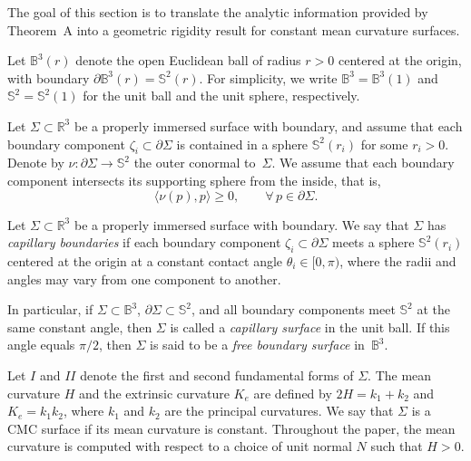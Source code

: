 \documentclass[11pt]{article}
\numberwithin{equation} {section}
\begin{document}
The goal of this section is to translate the analytic information provided by Theorem~A into a geometric rigidity result for constant mean curvature surfaces.

Let $\mathbb{B}^3(r)$ denote the open Euclidean ball of radius $r>0$ centered at the origin,
with boundary $\partial\mathbb{B}^3(r)=\mathbb{S}^2(r)$.
For simplicity, we write $\mathbb{B}^3=\mathbb{B}^3(1)$ and
$\mathbb{S}^2=\mathbb{S}^2(1)$ for the unit ball and the unit sphere, respectively.

Let $\Sigma\subset\mathbb{R}^3$ be a properly immersed surface with boundary, and assume that
each boundary component $\zeta_i\subset\partial\Sigma$ is contained in a sphere
$\mathbb{S}^2(r_i)$ for some $r_i>0$.
Denote by $\nu:\partial\Sigma\to\mathbb{S}^2$ the outer conormal to~$\Sigma$.
We assume that each boundary component intersects its supporting sphere from the inside, that is,
\[
\langle \nu(p),p\rangle \ge 0, \qquad \forall\, p\in\partial\Sigma.
\]

\begin{definition}\label{surfacesWithFreeBoundaries}
Let $\Sigma\subset\mathbb{R}^3$ be a properly immersed surface with boundary.
We say that $\Sigma$ has \emph{capillary boundaries} if each boundary component
$\zeta_i\subset\partial\Sigma$ meets a sphere $\mathbb{S}^2(r_i)$ centered at the origin
at a constant contact angle $\theta_i\in [0,\pi)$, where the radii and angles may vary from one
component to another.

In particular, if $\Sigma\subset\mathbb{B}^3$, $\partial\Sigma\subset\mathbb{S}^2$, and all
boundary components meet $\mathbb{S}^2$ at the same constant angle, then $\Sigma$ is called a \emph{capillary surface} in the unit ball.
If this angle equals $\pi/2$, then $\Sigma$ is said to be a \emph{free boundary surface}
in~$\mathbb{B}^3$.
\end{definition}

Let $I$ and $II$ denote the first and second fundamental forms of $\Sigma$.
The mean curvature $H$ and the extrinsic curvature $K_e$ are defined by
$2H=k_1+k_2$ and $K_e=k_1k_2$, where $k_1$ and $k_2$ are the principal curvatures.
We say that $\Sigma$ is a CMC surface if its mean curvature is constant.
Throughout the paper, the mean curvature is computed with respect to a choice
of unit normal $N$ such that $H>0$.
\end{document}
